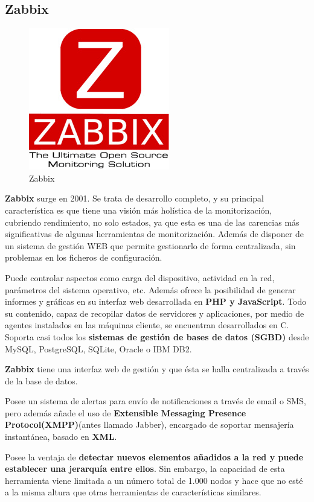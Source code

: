 \subsection{Zabbix}
\begin{figure}[H]
	\centering
	\includegraphics[scale=0.8]{imagenes/logos_monitorizacion/zabbix.png}
	\caption{Zabbix} \label{zabbix}
\end{figure}
\textbf{Zabbix} \cite{zabbix} surge en 2001. Se trata de desarrollo completo,  y su principal característica es que tiene una visión más holística de la monitorización, cubriendo rendimiento, no solo estados, ya que esta es una de las carencias más significativas de algunas herramientas de monitorización. Además de disponer de un sistema de gestión WEB que permite gestionarlo de forma centralizada, sin problemas en los ficheros de configuración.

Puede controlar aspectos como carga del dispositivo, actividad en la red, parámetros del sistema operativo, etc. Además ofrece la posibilidad de generar
informes y gráficas en su interfaz web desarrollada en \textbf{PHP y JavaScript}.
\newpage
Todo su contenido, capaz de recopilar datos de
servidores y aplicaciones, por medio de agentes instalados
en las máquinas cliente, se encuentran desarrollados en C. Soporta casi todos los  \textbf{sistemas de gestión de bases de datos (SGBD)} desde MySQL, PostgreSQL, SQLite, Oracle o IBM DB2.

\textbf{Zabbix} tiene una interfaz web de gestión y que ésta se halla centralizada a través de la base de datos.

Posee un sistema de alertas para envío de notificaciones a través de email o SMS, pero además añade el uso de \textbf{Extensible Messaging Presence Protocol(XMPP)}\cite{xmpp}(antes llamado Jabber), encargado de soportar mensajería instantánea, basado en \textbf{XML}.

Posee la ventaja de \textbf{detectar nuevos elementos añadidos a la red y puede establecer una jerarquía entre ellos}.
Sin embargo, la capacidad de esta herramienta viene limitada a un número total de 1.000 nodos y hace que no esté a la misma altura que otras herramientas de características similares.

